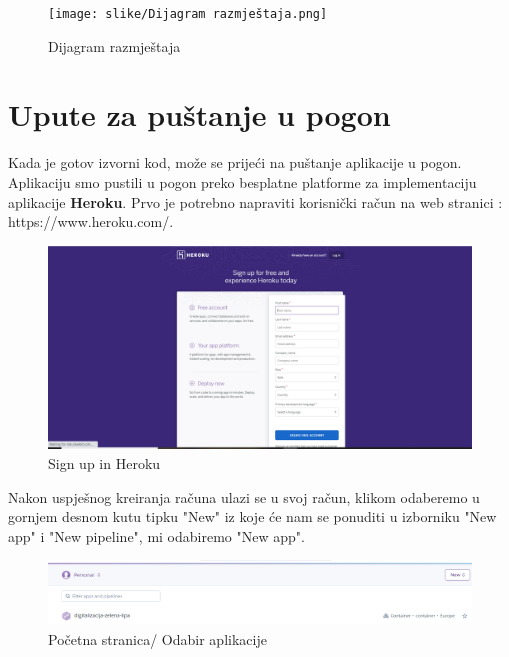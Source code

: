 			\begin{figure}[H]
				\texttt{[image: slike/Dijagram razmještaja.png]} %
				\centering
				\caption{Dijagram razmještaja}
				\label{DRAZ}
			\end{figure}
			\eject 
		
		\section{Upute za puštanje u pogon}
		
				
			 \text Kada je gotov izvorni kod, može se prijeći na puštanje aplikacije u pogon. Aplikaciju smo pustili u pogon preko besplatne platforme za implementaciju aplikacije \textbf{Heroku}. Prvo je potrebno napraviti korisnički račun na web stranici : https://www.heroku.com/. 
			 \begin{figure}[H]
			 	\includegraphics[scale=0.4]{slike/heroku sign up.png} 
			 	\centering
			 	\caption{Sign up in Heroku}
			 	\label{SUH}
			 \end{figure}
			 
			 Nakon uspješnog kreiranja računa ulazi se u svoj račun, klikom odaberemo u gornjem desnom kutu tipku "New" iz koje će nam se ponuditi u izborniku "New app" i "New pipeline", mi odabiremo "New app".
			 
			 \begin{figure}[H]
			 	\includegraphics[scale=0.5]{slike/odabir aplikacije.png} 
			 	\centering
			 	\caption{Početna stranica/ Odabir aplikacije}
			 	\label{HP}
			 \end{figure}
			 
